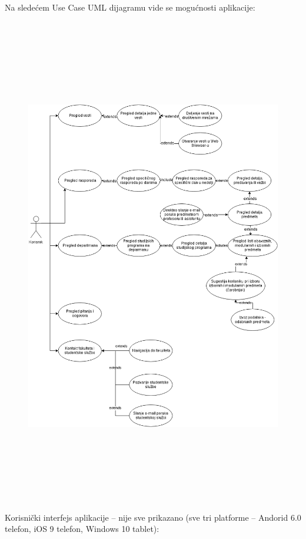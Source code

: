 \documentclass[a4paper]{article}
\begin{document}
\bigskip

\clearpage
Na sledećem Use Case UML dijagramu vide se mogućnosti aplikacije:

\subsection[]{\rmfamily }
\begin{figure}
\centering
\includegraphics[width=163.62mm,height=210.93mm]{msc-img15.png}
\end{figure}

\bigskip

Korisnički interfejs aplikacije – nije sve prikazano (sve tri platforme
– Andorid 6.0 telefon, iOS 9 telefon, Windows 10 tablet):
\end{document}
